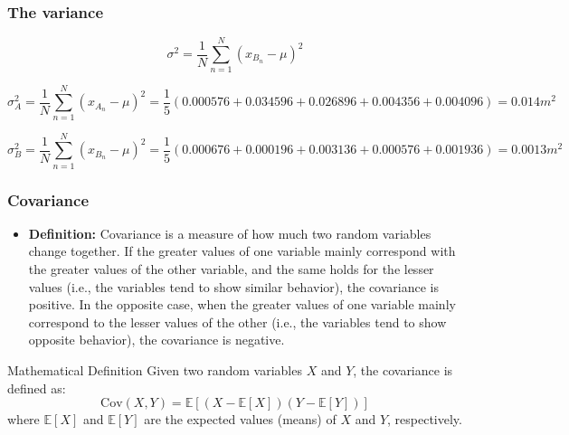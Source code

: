\documentclass{beamer}
\begin{document}
\begin{frame}
    \frametitle{The variance}
    
    \begin{equation*}
        \sigma^{2} = \frac{1}{N} \sum _{n=1}^{N} \left( x_{\scriptscriptstyle \!B_{n}} -  \mu  \right) ^{2}
    \end{equation*}

    \vspace{5mm}
    \tiny
    \begin{equation*}
        \sigma_{\scriptscriptstyle \!A}^{2} = \frac{1}{N} \sum _{n=1}^{N} \left( x_{\scriptscriptstyle \!A_{n}} -  \mu  \right) ^{2} = \frac{1}{5} \left( 0.000576+ 0.034596+ 0.026896+ 0.004356+ 0.004096 \right) = 0.014m^{2}
    \end{equation*}
    
    \vspace{1mm}
    
    \begin{equation*}
       \sigma_{\scriptscriptstyle \!B}^{2} = \frac{1}{N} \sum _{n=1}^{N} \left( x_{\scriptscriptstyle \!B_{n}} -  \mu  \right) ^{2} = \frac{1}{5} \left( 0.000676+ 0.000196+ 0.003136+ 0.000576+ 0.001936 \right) = 0.0013m^{2}
    \end{equation*}
   
\end{frame}

\begin{frame}
    \frametitle{Covariance}
    \footnotesize

    \begin{itemize}
        \item \textbf{Definition:}
        Covariance is a measure of how much two random variables change together. If the greater values of one variable mainly correspond with the greater values of the other variable, and the same holds for the lesser values (i.e., the variables tend to show similar behavior), the covariance is positive. In the opposite case, when the greater values of one variable mainly correspond to the lesser values of the other (i.e., the variables tend to show opposite behavior), the covariance is negative.
    \end{itemize}

    \begin{block}{Mathematical Definition}
        Given two random variables \(X\) and \(Y\), the covariance is defined as:
        \[
        \text{Cov}(X, Y) = \mathbb{E}[(X - \mathbb{E}[X])(Y - \mathbb{E}[Y])]
        \]
        where \(\mathbb{E}[X]\) and \(\mathbb{E}[Y]\) are the expected values (means) of \(X\) and \(Y\), respectively.
    \end{block}
\end{frame}
\end{document}
